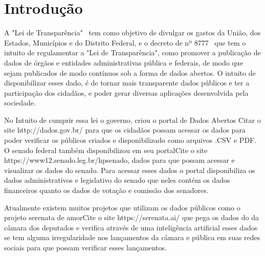 \section{\esp Introdução}

A "Lei de Transparência"~\cite{LeiC131:2009} tem como objetivo de divulgar os gastos da União, dos Estados, Municípios e do Distrito Federal, e o decreto de  nº 8777~\cite{Decreto8777:2016} que tem o intuito de regulamentar a "Lei de Transparência", como promover a publicação de dados de órgãos e  entidades administrativas pública e federais, de modo que sejam publicados de modo contínuos sob a forma de dados abertos. O intuito de disponibilizar esses dado, é de tornar mais transparente dados públicos e ter a participação dos cidadãos, e poder gerar diversas aplicações desenvolvida pela sociedade.

No Intuito de cumprir essa lei o governo, criou o portal de Dados Abertos {Citar o site http://dados.gov.br/} para que os cidadãos possam acessar os dados para poder verificar os públicos criados e disponibilizado como arquivos .CSV e PDF. O senado federal também disponibilizou em seu portal{Cite o site https://www12.senado.leg.br/hpsenado}, dados para que possam acessar e visualizar os dados do senado. Para acessar esses dados o portal disponibiliza os dados administrativos e legislativo do senado que neles contém os dados financeiros quanto os dados de votação e comissão dos senadores. 

Atualmente existem muitos projetos que utilizam os dados públicos como o projeto serenata de amor{Cite o site https://serenata.ai/} que pega os dados do da câmara dos deputados e verifica através de uma inteligência artificial esses dados se tem alguma irregularidade nos lançamentos da câmara e pública em suas redes sociais para que possam verificar esses lançamentos. 


